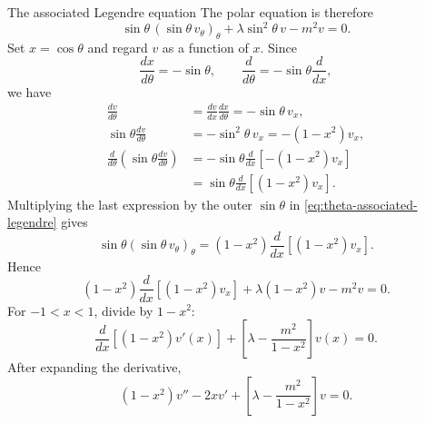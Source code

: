\documentclass[11pt]{beamer}
\begin{document}
\begin{frame}[allowframebreaks]{The associated Legendre equation}
The polar equation is therefore
\begin{equation}
  \sin\theta\,(\sin\theta\,v_\theta)_\theta
  +\lambda\sin^2\theta\,v-m^2v=0.
  \label{eq:theta-associated-legendre}
\end{equation}
Set $x=\cos\theta$ and regard $v$ as a function of $x$.  Since
\begin{equation}
  \frac{dx}{d\theta}=-\sin\theta,
  \qquad
  \frac{d}{d\theta}
    =-\sin\theta\frac{d}{dx},
  \label{eq:dthetadx}
\end{equation}
we have
\begin{align*}
  \frac{dv}{d\theta}
    &=\frac{dv}{dx}\frac{dx}{d\theta}
      =-\sin\theta\,v_x,\\
  \sin\theta\frac{dv}{d\theta}
    &=-\sin^2\theta\,v_x
      =-(1-x^2)v_x,\\
  \frac{d}{d\theta}
    \left(\sin\theta\frac{dv}{d\theta}\right)
    &=
      -\sin\theta\frac{d}{dx}
      \left[-(1-x^2)v_x\right]\\
    &=
      \sin\theta\frac{d}{dx}
      \left[(1-x^2)v_x\right].
\end{align*}
Multiplying the last expression by the outer $\sin\theta$ in
\eqref{eq:theta-associated-legendre} gives
\[
  \sin\theta(\sin\theta\,v_\theta)_\theta
    =(1-x^2)\frac{d}{dx}\left[(1-x^2)v_x\right].
\]
Hence
\[
  (1-x^2)\frac{d}{dx}\left[(1-x^2)v_x\right]
  +\lambda(1-x^2)v-m^2v=0.
\]
For $-1<x<1$, divide by $1-x^2$:
\begin{equation}
  \frac{d}{dx}\left[(1-x^2)v'(x)\right]
  +\left[
      \lambda-\frac{m^2}{1-x^2}
   \right]v(x)=0.
  \label{eq:assoc-legendre-general}
\end{equation}
After expanding the derivative,
\[
  (1-x^2)v''-2xv'
  +\left[
      \lambda-\frac{m^2}{1-x^2}
   \right]v=0.
\]


\end{frame}
\end{document}
